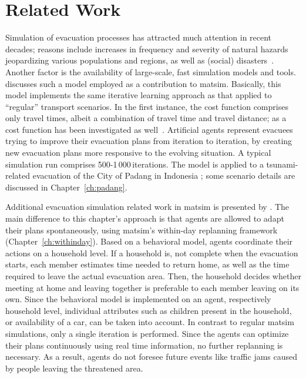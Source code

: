 \section{Related Work}
Simulation of evacuation processes has attracted much attention in recent decades; reasons include increases in frequency and severity of natural hazards jeopardizing various populations and regions, as well as (social) disasters~\citep{Rodr2006HBoDisasterResearch}. Another factor is the availability of large-scale, fast simulation models and tools. \citet{Laemmel_PhDThesis_2011} discusses such a model employed as a contribution to \gls{matsim}. Basically, this model implements the same iterative learning approach as that applied to ``regular'' transport scenarios. In the first instance, the cost function comprises only travel times, albeit a combination of travel time and travel distance; as a cost function has been investigated as well~\citep{00LaemmelKluepfelNagel2009EvacPadangAtBookTimmermanns}. 
Artificial agents represent evacuees trying to improve their evacuation plans from iteration to iteration, by creating new evacuation plans more responsive to the evolving situation. 
A typical simulation run comprises 500-1\,000\,iterations. 
The model is applied to a tsunami-related evacuation of the City of Padang in Indonesia \citep[e.g.,][]{00TaubenboeckEtAl2012ConcludingLastMilePaperNatHazards,00GosebergEtAl2012LastLastMile}; some scenario details are discussed in Chapter~\ref{ch:padang}. 

Additional evacuation simulation related work in \gls{matsim} is presented by \citet{Dobler_PhDThesis_2013}. The main difference to this chapter's approach is that agents are allowed to adapt their plans spontaneously, using \gls{matsim}'s within-day replanning framework \citep{DoblerEtAl_TRR_2012} (Chapter~\ref{ch:withinday}). 
Based on a behavioral model, agents coordinate their actions on a household level. If a household is, \eg not complete when the evacuation starts, each member estimates time needed to return home, as well as the time required to leave the actual evacuation area. Then, the household decides whether meeting at home and leaving together is preferable to each member leaving on its own.
Since the behavioral model is implemented on an agent, respectively household level, individual attributes such as children present in the household, or availability of a car, can be taken into account.
In contrast to regular \gls{matsim} simulations, only a single iteration is performed. Since the agents can optimize their plans continuously using real time information, no further replanning is necessary. As a result, agents do not foresee future events like traffic jams caused by people leaving the threatened area.

